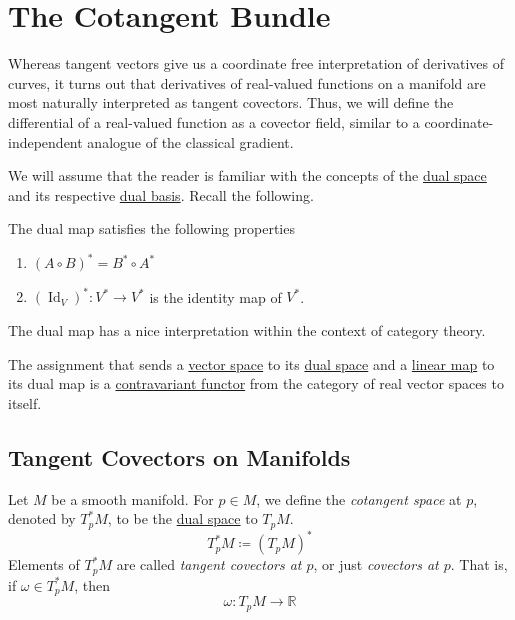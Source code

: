 \documentclass{article}
\DeclareMathOperator{\Id}{Id}
\newcounter{theorem}[section]
\newcounter{definition}[section]
\begin{document}
\section{The Cotangent Bundle}

  Whereas tangent vectors give us a coordinate free interpretation of derivatives of curves, it turns out that derivatives of real-valued functions on a manifold are most naturally interpreted as tangent covectors. Thus, we will define the differential of a real-valued function as a covector field, similar to a coordinate-independent analogue of the classical gradient. 

  We will assume that the reader is familiar with the concepts of the \hyperref[lin-def:dual-space]{dual space} and its respective \hyperref[lin-def:dual-basis]{dual basis}. Recall the following. 

  \begin{theorem}
    \label{thm:functorial-properties-of-the-dual-map}
  The dual map satisfies the following properties 
  \begin{enumerate}
      \item $(A \circ B)^* = B^* \circ A^*$
      \item $(\Id_V)^*: V^* \to V^*$ is the identity map of $V^*$. 
  \end{enumerate}
  \end{theorem}

  The dual map has a nice interpretation within the context of category theory.

  \begin{corollary}
    \label{thm:dualization-is-a-contravariant-functor}
  The assignment that sends a \hyperref[lin-def:vector-space]{vector space} to its \hyperref[lin-def:dual-space]{dual space} and a \hyperref[lin-def:linear_map]{linear map} to its dual map is a \hyperref[def:contravariant-functor]{contravariant functor} from the category of real vector spaces to itself. 
  \end{corollary}

  \subsection{Tangent Covectors on Manifolds}

    \begin{definition}
      \label{def:cotangent-space}
    Let $M$ be a smooth manifold. For $p \in M$, we define the \textit{cotangent space} at $p$, denoted by $T_p^* M$, to be the \hyperref[lin-def:dual-space]{dual space} to $T_p M$. 
    \begin{equation}
      T_p^* M \coloneqq (T_p M)^*
    \end{equation}
    Elements of $T_p^* M$ are called \textit{tangent covectors at $p$}, or just \textit{covectors at $p$}. That is, if $\omega \in T_p^* M$, then 
    \begin{equation}
      \omega: T_p M \to \mathbb{R}
    \end{equation}
    \end{definition}
\end{document}
